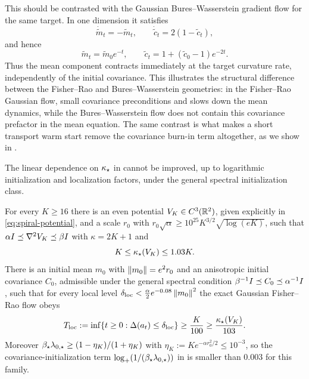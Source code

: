 \begin{remark}
This should be contrasted with the Gaussian Bures--Wasserstein gradient flow for the same
target. In one dimension it satisfies
\[
    \dot{\widetilde m}_t=-\widetilde m_t,
    \qquad
    \dot{\widetilde c}_t=2(1-\widetilde c_t),
\]
and hence
\[
    \widetilde m_t=\widetilde m_0e^{-t},
    \qquad
    \widetilde c_t=1+(\widetilde c_0-1)e^{-2t}.
\]
Thus the mean component contracts immediately at the target curvature rate, independently of
the initial covariance. This illustrates the structural difference between the Fisher--Rao and
Bures--Wasserstein geometries: in the Fisher--Rao Gaussian flow, small covariance preconditions
and slows down the mean dynamics, while the Bures--Wasserstein flow does not contain this
covariance prefactor in the mean equation. The same contrast is what makes a short transport
warm start remove the covariance burn-in term altogether, as we show in
.
\end{remark}

The linear dependence on $\kappa_\star$ in  cannot be improved, up to
logarithmic initialization and localization factors, under the general spectral initialization
class.

\begin{theorem}\label{thm:sharp-cont}
    For every $K\geq16$ there is an even potential $V_K\in C^3(\mathbb{R}^2)$, given explicitly in
    \eqref{eq:spiral-potential}, and a scale $r_0$ with
    $r_0\sqrt\alpha\geq10^{25}K^{3/2}\sqrt{\log(eK)}$, such that
    $\alpha I\preceq\nabla^2V_K\preceq\beta I$ with $\kappa=2K+1$ and
    \begin{equation*}
        K\leq\kappa_\star(V_K)\leq1.03K .
    \end{equation*}
    There is an initial mean $m_0$ with $\left\lVert m_0\right\rVert=e^2r_0$ and an anisotropic initial
    covariance $C_0$, admissible under the general spectral condition
    $\beta^{-1}I\preceq C_0\preceq\alpha^{-1}I$, such that for every local level
    $\delta_{\mathrm{loc}}<\tfrac\alpha2e^{-0.08}\left\lVert m_0\right\rVert^2$ the exact Gaussian Fisher--Rao flow
    obeys
    \begin{equation*}
        T_{\mathrm{loc}}:=\inf\{t\geq0:\Delta(a_t)\leq\delta_{\mathrm{loc}}\}
        \geq\frac K{100}
        \geq\frac{\kappa_\star(V_K)}{103}.
    \end{equation*}
    Moreover $\beta_\star\lambda_{0,\star}\geq(1-\eta_K)/(1+\eta_K)$ with
    $\eta_K:=Ke^{-\alpha r_0^2/2}\leq10^{-3}$, so the covariance-initialization term
    $\log_+(1/(\beta_\star\lambda_{0,\star}))$ in  is smaller than $0.003$ for this
    family.
\end{theorem}

